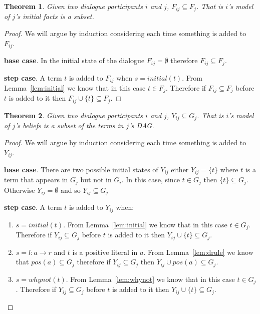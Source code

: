 \documentclass{blue-book}
\newtheorem{theorem}{Theorem}
\newcommand{\drule}[3]{\ensuremath{#1:#2 \rightarrow #3}}
\begin{document}
\begin{theorem}
Given two dialogue participants $i$ and $j$, $F_{ij} \subseteq F_j$.  That is $i$'s model of $j$'s initial facts is a subset.
\end{theorem}
\begin{proof}
We will argue by induction considering each time something is added to $F_{ij}$.

{\bf base case}.  In the initial state of the dialogue $F_{ij} = \emptyset$ therefore $F_{ij} \subseteq F_j$.

{\bf step case}.  A term $t$ is added to $F_{ij}$ when $s = initial(t)$.  From Lemma~\ref{lem:initial} we know that in this case $t \in F_j$.  Therefore if $F_{ij} \subseteq F_{j}$ before $t$ is added to it then $F_{ij} \cup \{t\} \subseteq F_{j}$.

\end{proof}
\begin{theorem}
Given two dialogue participants $i$ and $j$, $Y_{ij} \subseteq G_j$.  That is $i$'s model of $j$'s beliefs is a subset of the terms in $j$'s DAG.
\end{theorem}
\begin{proof}
We will argue by induction considering each time something is added to $Y_{ij}$.

{\bf base case}.  There are two possible initial states of $Y_{ij}$ either $Y_{ij} = \{t\}$ where $t$ is a term that appears in $G_j$ but not in $G_i$.  In this case, since $t \in G_j$ then $\{t\} \subseteq G_j$.  Otherwise $Y_{ij} = \emptyset$ and so $Y_{ij} \subseteq G_j$

{\bf step case}.  A term $t$ is added to $Y_{ij}$ when:
\begin{enumerate}
\item  $s = initial(t)$.  From Lemma~\ref{lem:initial} we know that in this case $t \in G_j$.  Therefore if $Y_{ij} \subseteq G_{j}$ before $t$ is added to it then $Y_{ij} \cup \{t\} \subseteq G_{j}$.
\item $s = \drule{l}{a}{r}$ and $t$ is a positive literal in $a$.  From Lemma~\ref{lem:drule} we know that $pos(a) \subseteq G_{j}$ therefore if $Y_{ij} \subseteq G_{j}$ then $Y_{ij} \cup pos(a) \subseteq G_{j}$.
\item $s = whynot(t)$.  From Lemma~\ref{lem:whynot} we  know that in this case $t \in G_j$.  Therefore if $Y_{ij} \subseteq G_{j}$ before $t$ is added to it then $Y_{ij} \cup \{t\} \subseteq G_{j}$.
\end{enumerate}
\end{proof}
\end{document}
